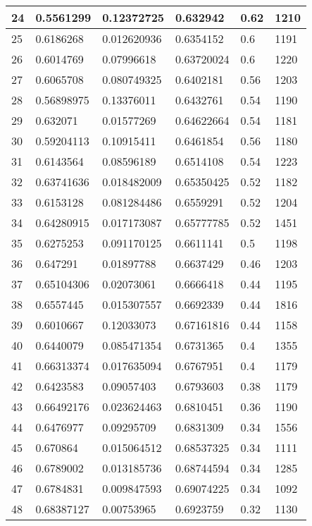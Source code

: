 \begin{longtable}{|l|l|l|l|l|l|}
24 & 0.5561299 & 0.12372725 & 0.632942 & 0.62 & 1210 \\ \hline 
25 & 0.6186268 & 0.012620936 & 0.6354152 & 0.6 & 1191 \\ \hline 
26 & 0.6014769 & 0.07996618 & 0.63720024 & 0.6 & 1220 \\ \hline 
27 & 0.6065708 & 0.080749325 & 0.6402181 & 0.56 & 1203 \\ \hline 
28 & 0.56898975 & 0.13376011 & 0.6432761 & 0.54 & 1190 \\ \hline 
29 & 0.632071 & 0.01577269 & 0.64622664 & 0.54 & 1181 \\ \hline 
30 & 0.59204113 & 0.10915411 & 0.6461854 & 0.56 & 1180 \\ \hline 
31 & 0.6143564 & 0.08596189 & 0.6514108 & 0.54 & 1223 \\ \hline 
32 & 0.63741636 & 0.018482009 & 0.65350425 & 0.52 & 1182 \\ \hline 
33 & 0.6153128 & 0.081284486 & 0.6559291 & 0.52 & 1204 \\ \hline 
34 & 0.64280915 & 0.017173087 & 0.65777785 & 0.52 & 1451 \\ \hline 
35 & 0.6275253 & 0.091170125 & 0.6611141 & 0.5 & 1198 \\ \hline 
36 & 0.647291 & 0.01897788 & 0.6637429 & 0.46 & 1203 \\ \hline 
37 & 0.65104306 & 0.02073061 & 0.6666418 & 0.44 & 1195 \\ \hline 
38 & 0.6557445 & 0.015307557 & 0.6692339 & 0.44 & 1816 \\ \hline 
39 & 0.6010667 & 0.12033073 & 0.67161816 & 0.44 & 1158 \\ \hline 
40 & 0.6440079 & 0.085471354 & 0.6731365 & 0.4 & 1355 \\ \hline 
41 & 0.66313374 & 0.017635094 & 0.6767951 & 0.4 & 1179 \\ \hline 
42 & 0.6423583 & 0.09057403 & 0.6793603 & 0.38 & 1179 \\ \hline 
43 & 0.66492176 & 0.023624463 & 0.6810451 & 0.36 & 1190 \\ \hline 
44 & 0.6476977 & 0.09295709 & 0.6831309 & 0.34 & 1556 \\ \hline 
45 & 0.670864 & 0.015064512 & 0.68537325 & 0.34 & 1111 \\ \hline 
46 & 0.6789002 & 0.013185736 & 0.68744594 & 0.34 & 1285 \\ \hline 
47 & 0.6784831 & 0.009847593 & 0.69074225 & 0.34 & 1092 \\ \hline 
48 & 0.68387127 & 0.00753965 & 0.6923759 & 0.32 & 1130 \\ \hline 

\end{longtable}
